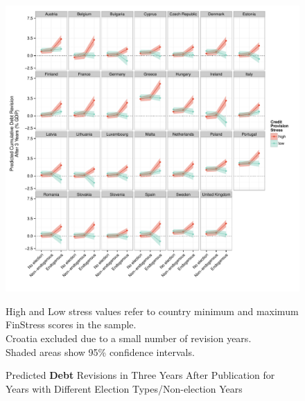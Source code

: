 \documentclass[]{article}
\begin{document}
\begin{figure}
	\caption{Predicted \textbf{Debt} Revisions in Three Years After Publication for Years with Different Election Types/Non-election Years}
    \label{country_predict_debt_required}
    \begin{center}
    	\includegraphics[scale=0.7]{figures/country_predict_required.pdf}
    \end{center}

	{\scriptsize{High and Low stress values refer to country minimum and maximum FinStress scores in the sample.\\
    Croatia excluded due to a small number of revision years.\\
    Shaded areas show 95\% confidence intervals.
}}

\end{figure}
\end{document}
